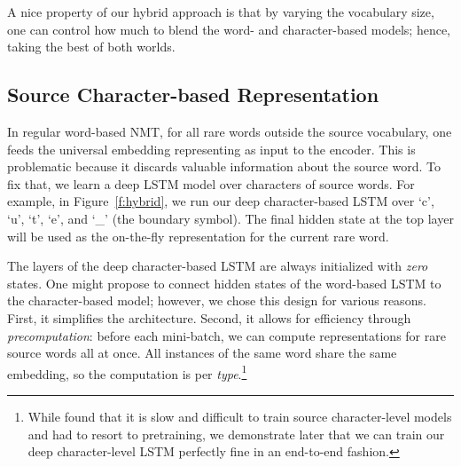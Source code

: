 A nice property of our hybrid approach is that by varying the vocabulary size,
 one can control how much to blend the
word- and character-based models; hence, taking the best of both
worlds. 


\subsection{Source Character-based Representation}
\label{subsec:src}
In regular word-based
NMT, for all rare words outside the source vocabulary, one feeds the
universal embedding representing \unk{} as input to the encoder. This is
problematic because it discards valuable information about the source word. To
fix that, we learn a deep LSTM model over characters
of source words. 
For example, in Figure~\ref{f:hybrid}, we run
our deep character-based LSTM over `c', `u', `t', `e', and `\_' (the boundary
symbol). The final hidden state at the top layer will be used as the on-the-fly
representation for the current rare word.

The layers of the deep character-based LSTM are always initialized with {\it
zero} states. One might propose to connect hidden
states of the word-based LSTM to the character-based model; however, we chose this design
for various reasons. First, it simplifies the architecture. Second, it allows
for efficiency through {\it precomputation}: before each mini-batch, we can compute
representations for rare source words all at once. All instances of the same
word share the same embedding, so the computation is per {\it type}.\footnote{While  found that it is slow and difficult to train
source character-level models and had to resort to pretraining, we demonstrate
later that we can train our deep character-level LSTM %
perfectly fine in an end-to-end fashion.} 




